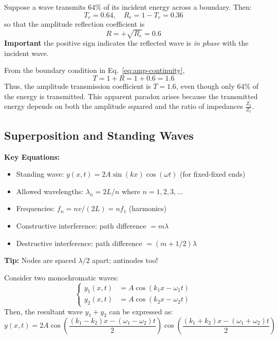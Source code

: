 \documentclass[11pt]{report}
\begin{document}
\begin{example}
Suppose a wave transmits \(64\%\) of its incident energy across a boundary. Then:
$$
    T_e = 0.64, 
    \quad R_e = 1 - T_e = 0.36
$$
so that the amplitude reflection coefficient is
$$
    R = +\sqrt{R_e} = 0.6 
$$
\textbf{Important} the positive sign indicates the reflected wave is \emph{in phase} with the incident wave.

From the boundary condition in Eq.~\eqref{eq:amp-continuity},
$$
    T = 1 + R = 1 + 0.6 = 1.6
$$
Thus, the amplitude transmission coefficient is \(T = 1.6\), even though only \(64\%\) of the energy is transmitted. This apparent paradox arises because the transmitted energy depends on both the amplitude squared and the ratio of impedances \(\tfrac{Z_2}{Z_1}\).
\end{example}
\subsection{Superposition and Standing Waves}

\begin{keybox}
\textbf{Key Equations:}
\begin{itemize}
    \item Standing wave: $y(x,t) = 2A\sin(kx)\cos(\omega t)$ (for fixed-fixed ends)
    \item Allowed wavelengths: $\lambda_n = 2L/n$ where $n = 1,2,3,...$
    \item Frequencies: $f_n = nv/(2L) = nf_1$ (harmonics)
    \item Constructive interference: path difference $= m\lambda$
    \item Destructive interference: path difference $= (m+1/2)\lambda$
\end{itemize}
\textbf{Tip:} Nodes are spaced $\lambda/2$ apart; antinodes too!
\end{keybox}
\begin{definition}
    Consider two monochromatic waves:
    $$
    \begin{cases}
        y_1(x,t) &= A \cos(k_1 x - \omega_1 t) \\
        y_2(x,t) &= A \cos(k_2 x - \omega_2 t)
    \end{cases}
    $$
    Then, the resultant wave $y_1 + y_2$ can be expressed as:
    $$
        y(x,t) = 2A \cos\left(\frac{(k_1 - k_2)x - (\omega_1 - \omega_2)t}{2}\right) \cos\left(\frac{(k_1 + k_2)x - (\omega_1 + \omega_2)t}{2}\right)
    $$
\end{definition}
\end{document}

